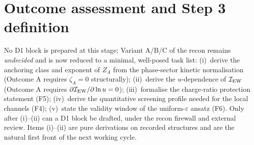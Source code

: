 \documentclass[11pt,a4paper]{article}
\begin{document}
\section{Outcome assessment and Step 3 definition}
No D1 block is prepared at this stage; Variant A/B/C of the recon remains
\emph{undecided} and is now reduced to a minimal, well-posed task list:
(i)~derive the anchoring class and exponent of $Z_A$ from the phase-sector kinetic
normalisation (Outcome A requires $\zeta_A=0$ structurally);
(ii)~derive the $u$-dependence of $\mathcal I_{\rm EW}$ (Outcome A requires
$\partial\mathcal I_{\rm EW}/\partial\ln u=0$);
(iii)~formalise the charge-ratio protection statement (F5);
(iv)~derive the quantitative screening profile needed for the local channels (F4);
(v)~state the validity window of the uniform-$\varepsilon$ ansatz (F6).
Only after (i)--(ii) can a D1 block be drafted, under the recon firewall and
external review. Items (i)--(ii) are pure derivations on recorded structures and
are the natural first front of the next working cycle.
\end{document}
